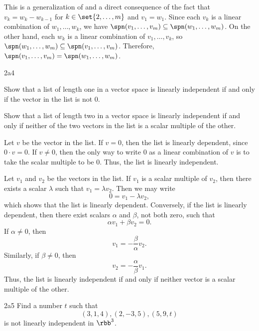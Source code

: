 \begin{sol}
    This is a generalization of  and a direct consequence of the fact that $v_k = w_k - w_{k-1}$ for $k \in \set{2, \ldots, m}$ and $v_1 = w_1$.
	Since each $v_k$ is a linear combination of $w_1, \ldots, w_k$, we have $\spn(v_1, \ldots, v_m) \subseteq \spn(w_1, \ldots, w_m)$.
	On the other hand, each $w_k$ is a linear combination of $v_1, \ldots, v_k$, so $\spn(w_1, \ldots, w_m) \subseteq \spn(v_1, \ldots, v_m)$.
	Therefore, $\spn(v_1, \ldots, v_m) = \spn(w_1, \ldots, w_m)$.
\end{sol}
 
\begin{exercise}{2a4}
    \begin{subexercises}
        \item Show that a list of length one in a vector space is linearly independent if and only if the vector in the list is not 0.
        \item Show that a list of length two in a vector space is linearly independent if and only if neither of the two vectors in the list is a scalar multiple of the other.
    \end{subexercises}
\end{exercise}

\begin{solenum}
    \item Let $v$ be the vector in the list.
	If $v = 0$, then the list is linearly dependent, since $0 \cdot v = 0$.
	If $v \neq 0$, then the only way to write $0$ as a linear combination of $v$ is to take the scalar multiple to be $0$.
	Thus, the list is linearly independent.
    \item Let $v_1$ and $v_2$ be the vectors in the list.
	If $v_1$ is a scalar multiple of $v_2$, then there exists a scalar $\lambda$ such that $v_1 = \lambda v_2$.
	Then we may write
    \[
    	0 = v_1 - \lambda v_2,
    \]
    which shows that the list is linearly dependent.
	Conversely, if the list is linearly dependent, then there exist scalars $\alpha$ and $\beta$, not both zero, such that
    \[
    	\alpha v_1 + \beta v_2 = 0.
    \]
    If $\alpha \neq 0$, then
    \[
    	v_1 = -\frac{\beta}{\alpha} v_2.
    \]
    Similarly, if $\beta \neq 0$, then
    \[
    	v_2 = -\frac{\alpha}{\beta} v_1.
    \]
    Thus, the list is linearly independent if and only if neither vector is a scalar multiple of the other.
\end{solenum}
 
\begin{exercise}{2a5}
    Find a number $t$ such that
    \[
    	(3, 1, 4), (2, -3, 5), (5, 9, t)
    \]
    is not linearly independent in $\rbb^3$.
\end{exercise}

